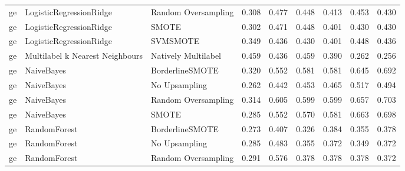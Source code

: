 \begin{tabular}{lllllllll}
      ge &         LogisticRegressionRidge &           Random Oversampling & 0.308 &                     0.477 &                 0.448 &                  0.413 &                                   0.453 &     0.430 \\
      ge &         LogisticRegressionRidge &                         SMOTE & 0.302 &                     0.471 &                 0.448 &                  0.401 &                                   0.430 &     0.430 \\
      ge &         LogisticRegressionRidge &                      SVMSMOTE & 0.349 &                     0.436 &                 0.430 &                  0.401 &                                   0.448 &     0.436 \\
      ge & Multilabel k Nearest Neighbours &           Natively Multilabel & 0.459 &                     0.436 &                 0.459 &                  0.390 &                                   0.262 &     0.256 \\
      ge &                      NaiveBayes &               BorderlineSMOTE & 0.320 &                     0.552 &                 0.581 &                  0.581 &                                   0.645 &     0.692 \\
      ge &                      NaiveBayes &                 No Upsampling & 0.262 &                     0.442 &                 0.453 &                  0.465 &                                   0.517 &     0.494 \\
      ge &                      NaiveBayes &           Random Oversampling & 0.314 &                     0.605 &                 0.599 &                  0.599 &                                   0.657 &     0.703 \\
      ge &                      NaiveBayes &                         SMOTE & 0.285 &                     0.552 &                 0.570 &                  0.581 &                                   0.663 &     0.698 \\
      ge &                    RandomForest &               BorderlineSMOTE & 0.273 &                     0.407 &                 0.326 &                  0.384 &                                   0.355 &     0.378 \\
      ge &                    RandomForest &                 No Upsampling & 0.285 &                     0.483 &                 0.355 &                  0.372 &                                   0.349 &     0.372 \\
      ge &                    RandomForest &           Random Oversampling & 0.291 &                     0.576 &                 0.378 &                  0.378 &                                   0.378 &     0.372 \\

\end{tabular}
